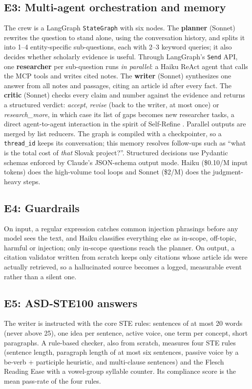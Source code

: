 \documentclass[conference]{IEEEtran}
\begin{document}
\subsection{E3: Multi-agent orchestration and memory}
The crew is a LangGraph \texttt{StateGraph} with six nodes. The \textbf{planner} (Sonnet) rewrites the
question to stand alone, using the conversation history, and splits it into 1--4 entity-specific
sub-questions, each with 2--3 keyword queries; it also decides whether scholarly evidence is useful. Through
LangGraph's \texttt{Send} API, one \textbf{researcher} per sub-question runs \emph{in parallel}: a Haiku ReAct
agent that calls the MCP tools and writes cited notes. The \textbf{writer} (Sonnet) synthesizes one answer
from all notes and passages, citing an article id after every fact. The \textbf{critic} (Sonnet) checks every
claim and number against the evidence and returns a structured verdict: \emph{accept}, \emph{revise} (back to
the writer, at most once) or \emph{research\_more}, in which case its list of gaps becomes new researcher tasks,
a direct agent-to-agent interaction in the spirit of Self-Refine \cite{madaan2023selfrefine}. Parallel
outputs are merged by list reducers. The graph is compiled with a checkpointer, so a \texttt{thread\_id}
keeps its conversation; this memory resolves follow-ups such as ``what is the total cost of \emph{that}
Slovak project?''. Structured decisions use Pydantic schemas enforced by Claude's JSON-schema output mode.
Haiku (\$0.10/M input tokens) does the high-volume tool loops and Sonnet (\$2/M) does the judgment-heavy
steps.

\subsection{E4: Guardrails}
On input, a regular expression catches common injection phrasings before any model sees the text, and Haiku
classifies everything else as in-scope, off-topic, harmful or injection; only in-scope questions reach the
planner. On output, a citation validator written from scratch keeps only citations whose article ids were
actually retrieved, so a hallucinated source becomes a logged, measurable event rather than a silent one.

\subsection{E5: ASD-STE100 answers}
The writer is instructed with the core STE rules: sentences of at most 20 words (never above 25), one idea
per sentence, active voice, one term per concept, short paragraphs. A rule-based checker, also from scratch,
measures four STE rules (sentence length, paragraph length of at most six sentences, passive voice by a
be-verb + participle heuristic, and multi-clause sentences) and the Flesch Reading Ease \cite{flesch1948}
with a vowel-group syllable counter. Its compliance score is the mean pass-rate of the four rules.
\end{document}

